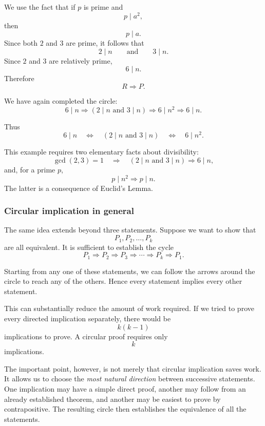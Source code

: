 We use the fact that if $p$ is prime and
\[
        p\mid a^2,
\]
then
\[
        p\mid a.
\]
Since both $2$ and $3$ are prime, it follows that
\[
        2\mid n
        \qquad\text{and}\qquad
        3\mid n.
\]
Since $2$ and $3$ are relatively prime,
\[
        6\mid n.
\]
Therefore
\[
        R\Longrightarrow P.
\]

We have again completed the circle:
\[
\boxed{
6\mid n
\Longrightarrow
(2\mid n\text{ and }3\mid n)
\Longrightarrow
6\mid n^2
\Longrightarrow
6\mid n.
}
\]

Thus
\[
\boxed{
6\mid n
\quad\Longleftrightarrow\quad
(2\mid n\text{ and }3\mid n)
\quad\Longleftrightarrow\quad
6\mid n^2.
}
\]

This example requires two elementary facts about divisibility:
\[
\gcd(2,3)=1
\quad\Longrightarrow\quad
(2\mid n\text{ and }3\mid n)\Longrightarrow6\mid n,
\]
and, for a prime $p$,
\[
        p\mid n^2\Longrightarrow p\mid n.
\]
The latter is a consequence of Euclid's Lemma. 


\subsubsection*{Circular implication in general}

The same idea extends beyond three statements. Suppose we want to show
that
\[
        P_1,P_2,\ldots,P_k
\]
are all equivalent. It is sufficient to establish the cycle
\[
\boxed{
P_1\Longrightarrow P_2
\Longrightarrow P_3
\Longrightarrow\cdots
\Longrightarrow P_k
\Longrightarrow P_1.
}
\]

Starting from any one of these statements, we can follow the arrows
around the circle to reach any of the others. Hence every statement
implies every other statement.

This can substantially reduce the amount of work required. If we tried
to prove every directed implication separately, there would be
\[
        k(k-1)
\]
implications to prove. A circular proof requires only
\[
        k
\]
implications.

The important point, however, is not merely that circular implication
saves work. It allows us to choose the \emph{most natural direction}
between successive statements. One implication may have a simple
direct proof, another may follow from an already established theorem,
and another may be easiest to prove by contrapositive. The resulting
circle then establishes the equivalence of all the statements.



